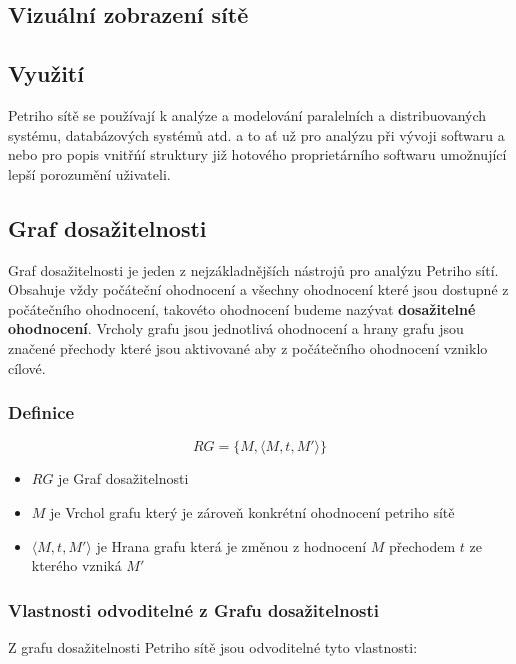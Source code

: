 \documentclass[
  biblatex,
  glossaries,
  index
]{kidiplom}
\begin{document}


\subsection{Vizuální zobrazení sítě}


\subsection{Využití}

Petriho sítě se používají k analýze a modelování paralelních
a distribuovaných systému, databázových systémů atd. a to ať už
pro analýzu při vývoji softwaru a nebo pro popis vnitřńí struktury
již hotového proprietárního softwaru umožnující lepší porozumění uživateli.

\subsection{Graf dosažitelnosti}

Graf dosažitelnosti je jeden z nejzákladnějších nástrojů pro analýzu Petriho sítí.
Obsahuje vždy počáteční ohodnocení a všechny ohodnocení které jsou dostupné z počátečního ohodnocení, 
takovéto ohodnocení budeme nazývat \textbf{dosažitelné ohodnocení}. 
Vrcholy grafu jsou jednotlivá ohodnocení
a hrany grafu jsou značené přechody které jsou aktivované aby z počátečního ohodnocení vzniklo cílové.

\subsubsection{Definice}
$$RG = \{M, \langle M, t, M' \rangle\}$$
\begin{itemize}
  \item $RG$ je Graf dosažitelnosti
  \item $M$ je Vrchol grafu který je zároveň konkrétní ohodnocení petriho sítě
  \item $\langle M, t, M' \rangle$ je Hrana grafu která je změnou z hodnocení $M$ přechodem $t$ ze kterého vzniká $M'$
\end{itemize}

\subsubsection{Vlastnosti odvoditelné z Grafu dosažitelnosti}
Z grafu dosažitelnosti Petriho sítě jsou odvoditelné tyto vlastnosti:
\end{document}
